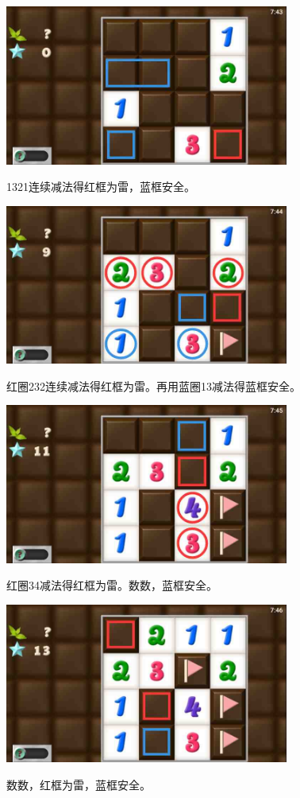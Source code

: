 \subsection{} %
\begin{center}
    \includegraphics[width=0.7\textwidth]{puzzlelow/46-1.jpg}
\end{center}
1321连续减法得红框为雷，蓝框安全。
\begin{center}
    \includegraphics[width=0.7\textwidth]{puzzlelow/46-2.jpg}
\end{center}
红圈232连续减法得红框为雷。再用蓝圈13减法得蓝框安全。
\begin{center}
    \includegraphics[width=0.7\textwidth]{puzzlelow/46-3.jpg}
\end{center}
红圈34减法得红框为雷。数数，蓝框安全。
\begin{center}
    \includegraphics[width=0.7\textwidth]{puzzlelow/46-4.jpg}
\end{center}
数数，红框为雷，蓝框安全。

